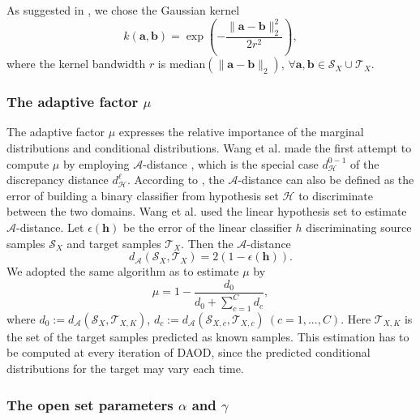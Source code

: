 \documentclass[journal]{IEEEtran}
\begin{document}
As suggested in \cite{gretton2012kernel,DBLP:conf/mm/WangFCYHY18}, we chose the Gaussian kernel
\begin{equation}
    k(\mathbf{a},\mathbf{b})=\exp(-\frac{\|\mathbf{a-b}\|^2_{2}}{2r^2}),
\end{equation}
where the kernel bandwidth $r$ is median$(\|\mathbf{a-b}\|_{2})$, $\forall \mathbf{a}, \mathbf{b}\in \mathcal{S}_X\cup\mathcal{T}_X$.

\subsubsection{{The adaptive factor $\mu$}}

The adaptive factor $\mu$ expresses the relative importance of the marginal distributions and conditional distributions. Wang et al. \cite{DBLP:conf/mm/WangFCYHY18} made the first attempt to compute $\mu$ by employing $\mathcal{A}$-distance \cite{DBLP:conf/nips/Ben-DavidBCP06}, which is the special case $d_{\mathcal{H}}^{0-1}$ of the discrepancy distance $d_{\mathcal{H}}^\ell$. According to \cite{DBLP:conf/nips/Ben-DavidBCP06}, the $\mathcal{A}$-distance can also be defined as the error of building
a binary classifier from hypothesis set $\mathcal{H}$ to discriminate between the two domains. Wang et al. \cite{DBLP:conf/mm/WangFCYHY18} used the linear hypothesis set to estimate $\mathcal{A}$-distance. Let $\epsilon({\bm h})$ be the error of the linear classifier $h$ discriminating source samples $\mathcal{S}_X$ and target samples $\mathcal{T}_X$. Then the $\mathcal{A}$-distance
\begin{equation*}
    d_{\mathcal{A}}(\mathcal{S}_X,\mathcal{T}_X)=2(1-\epsilon({\bm h})).
\end{equation*}
We adopted the same algorithm as \cite{DBLP:conf/mm/WangFCYHY18} to estimate $\mu$ by
\begin{equation*}
    \mu=1-\frac{d_0}{d_0+\sum_{c=1}^{C}d_c},
\end{equation*}
where $d_0:=d_{\mathcal{A}}(\mathcal{S}_X,\mathcal{T}_{X,K})$, $d_c:=d_{\mathcal{A}}(\mathcal{S}_{X,c},\mathcal{T}_{X,c}) ~(c=1,...,C)$. Here $\mathcal{T}_{X,K}$ is the set of the target samples predicted as known samples. This estimation has to be computed at every iteration of DAOD, since the predicted conditional distributions for the target may
vary each time.
\subsubsection{{The open set parameters $\alpha$ and $\gamma$}}
\end{document}
